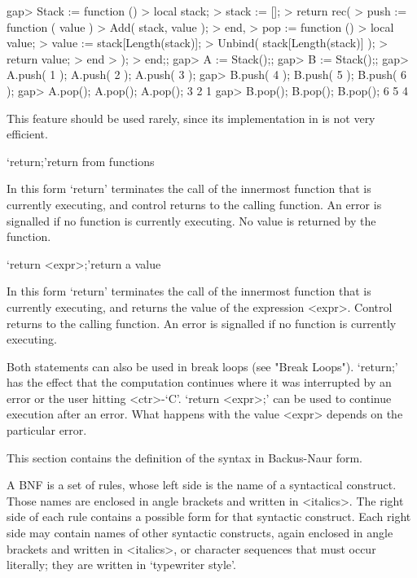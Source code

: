 \beginexample
gap> Stack := function ()
>     local  stack;
>     stack := [];
>     return rec(
>       push := function ( value )
>         Add( stack, value );
>       end,
>       pop := function ()
>         local  value;
>         value := stack[Length(stack)];
>         Unbind( stack[Length(stack)] );
>         return value;
>       end
>     );
>  end;;
gap> A := Stack();;
gap> B := Stack();;
gap> A.push( 1 ); A.push( 2 ); A.push( 3 );
gap> B.push( 4 ); B.push( 5 ); B.push( 6 );
gap> A.pop(); A.pop(); A.pop();
3
2
1
gap> B.pop(); B.pop(); B.pop();
6
5
4
\endexample

This feature should be used rarely, since its implementation in {\GAP} is
not very efficient.


\>`return;'{return from functions}

In this form `return' terminates the call of the innermost function that
is currently executing, and control returns to the calling function. An
error is signalled if no function is currently executing. No value is
returned by the function.

\>`return <expr>;'{return a value}

In this form `return' terminates the call of the innermost function that
is currently executing, and returns the value of the expression <expr>.
Control returns to the calling function. An error is signalled if no
function is currently executing.

Both statements can also be used in break loops (see "Break Loops").
`return;' has the effect that the computation continues where it was
interrupted by an error or the user hitting <ctr>-`C'.  `return <expr>;'
can be used to continue execution after an error. What happens with the
value <expr> depends on the particular error.




This section contains the definition  of the {\GAP} syntax in Backus-Naur
form.

A  BNF is a set of rules, whose left side  is the name of  a  syntactical
construct.  Those  names  are enclosed in angle  brackets and  written in
<italics>.  The right side of each rule contains a possible form for that
syntactic  construct.   Each  right  side  may  contain  names  of  other
syntactic  constructs,  again  enclosed in angle brackets and written  in
<italics>,  or character  sequences that  must  occur literally; they are
written in `typewriter style'.

